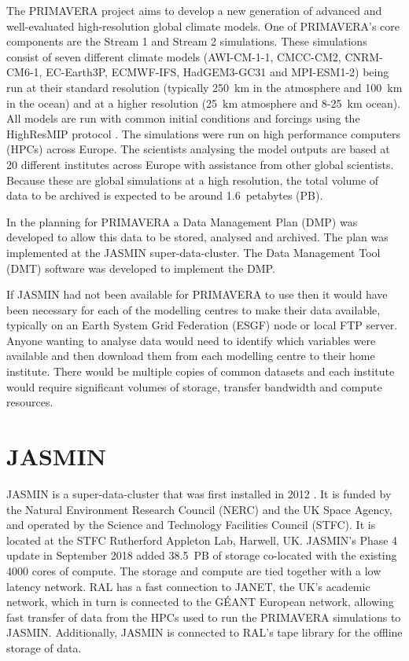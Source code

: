 \documentclass[gmd, manuscript]{copernicus}
\begin{document}


\introduction  %

The PRIMAVERA project aims to develop a new generation of advanced and well-evaluated high-resolution global climate models. One of PRIMAVERA's core components are the Stream 1 and Stream 2 simulations. These simulations consist of seven different climate models (AWI-CM-1-1, CMCC-CM2, CNRM-CM6-1, EC-Earth3P, ECMWF-IFS, HadGEM3-GC31 and MPI-ESM1-2) being run at their standard resolution (typically  250~km in the atmosphere and 100~km in the ocean) and at a higher resolution (25~km atmosphere and 8-25~km ocean). All models are run with common initial conditions and forcings using the HighResMIP protocol \citep{Haarsma2016}. The simulations were run on high performance computers (HPCs) across Europe. The scientists analysing the model outputs are based at 20 different institutes across Europe with assistance from other global scientists. Because these are global simulations at a high resolution, the total volume of data to be archived is expected to be around 1.6~petabytes (PB).

In the planning for PRIMAVERA a Data Management Plan (DMP) was developed to allow this data to be stored, analysed and archived. The plan was implemented at the JASMIN super-data-cluster. The Data Management Tool (DMT) software was developed to implement the DMP.

If JASMIN had not been available for PRIMAVERA to use then it would have been necessary for each of the modelling centres to make their data available, typically on an Earth System Grid Federation (ESGF) node or local FTP server. Anyone wanting to analyse data would need to identify which variables were available and then download them from each modelling centre to their home institute. There would be multiple copies of common datasets and each institute would require significant volumes of storage, transfer bandwidth and compute resources.

\section{JASMIN}

JASMIN is a super-data-cluster that was first installed in 2012 \citep{lawrence2013storing}. It is funded by the Natural Environment Research Council (NERC) and the UK Space Agency, and operated by the Science and Technology Facilities Council (STFC). It is located at the STFC Rutherford Appleton Lab, Harwell, UK. JASMIN's Phase 4 update in September 2018 added 38.5~PB of storage co-located with the existing 4000 cores of compute. The storage and compute are tied together with a low latency network. RAL has a fast connection to JANET, the UK's academic network, which in turn is connected to the G\'{E}ANT European network, allowing fast transfer of data from the HPCs used to run the PRIMAVERA simulations to JASMIN. Additionally, JASMIN is connected to RAL's tape library for the offline storage of data.
\end{document}

